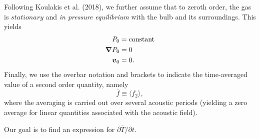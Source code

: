 Following Koulakis et al. (2018), we further assume that to zeroth order, the gas is $stationary$ and \textit{in pressure equilibrium} with the bulb and its surroundings.  This yields
\begin{align}
P_0 &= \mathrm{constant} \\ 
\boldsymbol{\nabla} P_0 &= 0 \\
\boldsymbol{v}_0 &= 0.
\end{align}
Finally, we use the overbar notation and brackets to indicate the time-averaged value of a second order quantity, namely
\begin{equation}
\overline{f} \equiv \langle f_2 \rangle,
\end{equation}
where the averaging is carried out over several acoustic periods (yielding a zero average for linear quantities associated with the acoustic field).

Our goal is to find an expression for $\partial\overline{T}/\partial t$.
